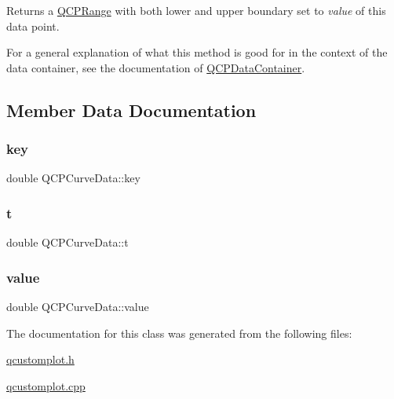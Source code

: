 Returns a \hyperlink{class_q_c_p_range}{Q\+C\+P\+Range} with both lower and upper boundary set to {\itshape value} of this data point.

For a general explanation of what this method is good for in the context of the data container, see the documentation of \hyperlink{class_q_c_p_data_container}{Q\+C\+P\+Data\+Container}. 

\subsection{Member Data Documentation}
\mbox{\label{class_q_c_p_curve_data_a8a4ec5f2b9a396149fd842e309701bd4}} 
\subsubsection{\texorpdfstring{key}{key}}
{\footnotesize\ttfamily double Q\+C\+P\+Curve\+Data\+::key}

\mbox{\label{class_q_c_p_curve_data_aecc395525be28e9178a088793beb3ff3}} 
\subsubsection{\texorpdfstring{t}{t}}
{\footnotesize\ttfamily double Q\+C\+P\+Curve\+Data\+::t}

\mbox{\label{class_q_c_p_curve_data_a72b39b8e1dbf7b45382ebd48419b6828}} 
\subsubsection{\texorpdfstring{value}{value}}
{\footnotesize\ttfamily double Q\+C\+P\+Curve\+Data\+::value}



The documentation for this class was generated from the following files\+:\begin{DoxyCompactItemize}
\item 
\hyperlink{qcustomplot_8h}{qcustomplot.\+h}\item 
\hyperlink{qcustomplot_8cpp}{qcustomplot.\+cpp}\end{DoxyCompactItemize}
